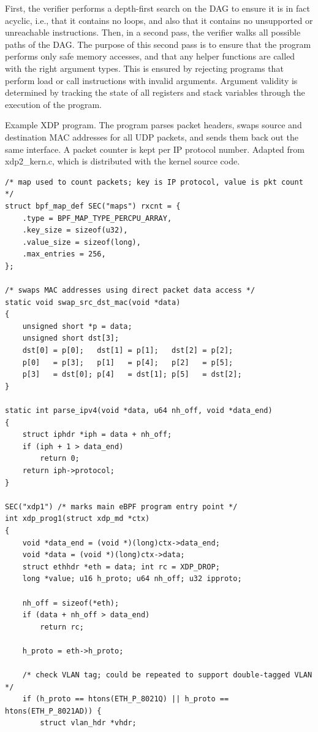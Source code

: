 \documentclass[sigconf]{acmart}
\begin{document}
First, the verifier performs a depth-first search on the DAG to ensure it is in
fact acyclic, i.e., that it contains no loops, and also that it contains no
unsupported or unreachable instructions. Then, in a second pass, the verifier
walks all possible paths of the DAG. The purpose of this second pass is to
ensure that the program performs only safe memory accesses, and that any helper
functions are called with the right argument types. This is ensured by rejecting
programs that perform load or call instructions with invalid arguments. Argument
validity is determined by tracking the state of all registers and stack
variables through the execution of the program.

\begin{listing}[p]
  \caption{\label{lst:ex-xdp-prog}Example XDP program. The program parses packet
    headers, swaps source and destination MAC addresses for all UDP packets, and
    sends them back out the same interface. A packet counter is kept per IP
    protocol number. Adapted from xdp2\_kern.c, which is distributed with the
    kernel source code.}
\begin{verbatim}
/* map used to count packets; key is IP protocol, value is pkt count */
struct bpf_map_def SEC("maps") rxcnt = {
	.type = BPF_MAP_TYPE_PERCPU_ARRAY,
	.key_size = sizeof(u32),
	.value_size = sizeof(long),
	.max_entries = 256,
};

/* swaps MAC addresses using direct packet data access */
static void swap_src_dst_mac(void *data)
{
	unsigned short *p = data;
	unsigned short dst[3];
	dst[0] = p[0];   dst[1] = p[1];   dst[2] = p[2];
	p[0]   = p[3];   p[1]   = p[4];   p[2]   = p[5];
	p[3]   = dst[0]; p[4]   = dst[1]; p[5]   = dst[2];
}

static int parse_ipv4(void *data, u64 nh_off, void *data_end)
{
	struct iphdr *iph = data + nh_off;
	if (iph + 1 > data_end)
		return 0;
	return iph->protocol;
}

SEC("xdp1") /* marks main eBPF program entry point */
int xdp_prog1(struct xdp_md *ctx)
{
	void *data_end = (void *)(long)ctx->data_end;
	void *data = (void *)(long)ctx->data;
	struct ethhdr *eth = data; int rc = XDP_DROP;
	long *value; u16 h_proto; u64 nh_off; u32 ipproto;

	nh_off = sizeof(*eth);
	if (data + nh_off > data_end)
		return rc;

	h_proto = eth->h_proto;

	/* check VLAN tag; could be repeated to support double-tagged VLAN */
	if (h_proto == htons(ETH_P_8021Q) || h_proto == htons(ETH_P_8021AD)) {
		struct vlan_hdr *vhdr;


\end{verbatim}
\end{listing}
\end{document}
